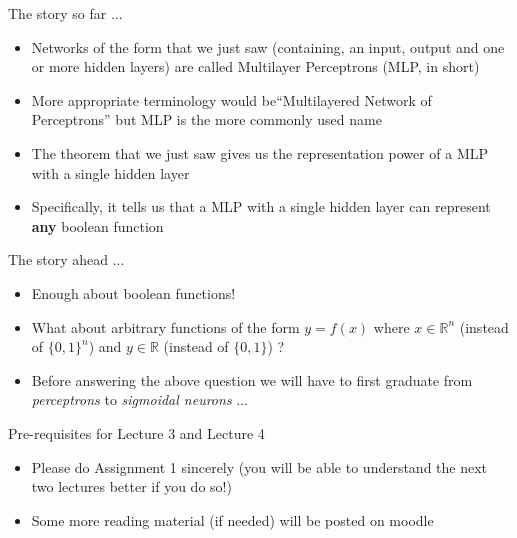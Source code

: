 \documentclass[serif, aspectratio=169]{beamer}
\begin{document}
\begin{frame}
	\begin{block}{The story so far ...}
		\begin{itemize}\justifying
			\item<1-> Networks of the form that we just saw (containing, an input, output and one or more hidden layers) are called Multilayer Perceptrons (MLP, in short)
			\item<2-> More appropriate terminology would be``Multilayered Network of Perceptrons'' but MLP is the more commonly used name
			\item<3-> The theorem that we just saw gives us the representation power of a MLP with a single hidden layer
			\item<4-> Specifically, it tells us that a MLP with a single hidden layer can represent \textbf{any} boolean function
		\end{itemize}
	\end{block}
\end{frame}

\begin{frame}
	\begin{block}{The story ahead ...}
		\begin{itemize}\justifying
			\item<1-> Enough about boolean functions!
			\item<2-> What about arbitrary functions of the form $y=f(x)$ where $x\in \mathbb{R}^n$ (instead of $\{0, 1\}^n$) and $y \in \mathbb{R}$ (instead of $\{0, 1\}$) ?
			\item<3-> Before answering the above question we will have to first graduate from \textit{perceptrons} to \textit{sigmoidal neurons} ...
		\end{itemize}
	\end{block}
\end{frame}

\begin{frame}
	\begin{block}{Pre-requisites for Lecture 3 and Lecture 4}
		\begin{itemize}\justifying
			\item Please do Assignment 1 sincerely (you will be able to understand the next two lectures better if you do so!)
			\item Some more reading material (if needed) will be posted on moodle
		\end{itemize}
	\end{block}
\end{frame}
\end{document}
